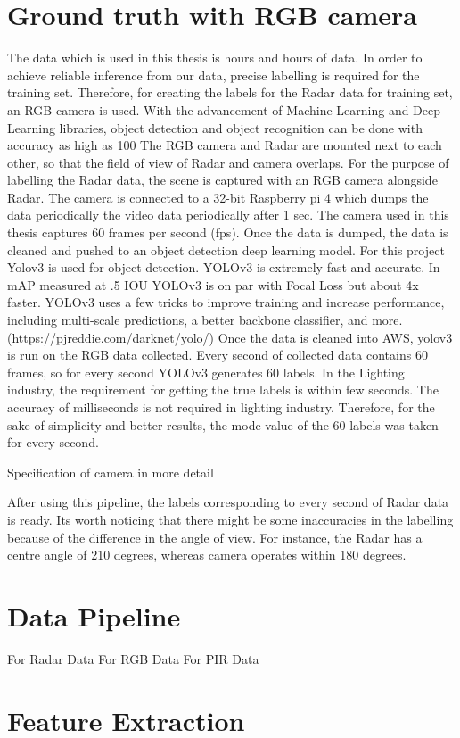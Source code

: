 \section{Ground truth with RGB camera}
\label{section:environments}
The data which is used in this thesis is hours and hours of data. In order to achieve reliable inference from our data, precise labelling is required for the training set. Therefore, for creating the labels for the Radar data for training set, an RGB camera is used. 
With the advancement of Machine Learning and Deep Learning libraries, object detection and object recognition can be done with accuracy as high as 100%
The RGB camera and Radar are mounted next to each other, so that the field of view of Radar and camera overlaps. For the purpose of labelling the Radar data, the scene is captured with an RGB camera alongside Radar. The camera is connected to a 32-bit Raspberry pi 4 which dumps the data periodically the video data periodically after 1 sec. The camera used in this thesis captures 60 frames per second (fps).
Once the data is dumped, the data is cleaned and pushed to an object detection deep learning model. For this project Yolov3 is used for object detection. YOLOv3 is extremely fast and accurate. In mAP measured at .5 IOU YOLOv3 is on par with Focal Loss but about 4x faster. YOLOv3 uses a few tricks to improve training and increase performance, including multi-scale predictions, a better backbone classifier, and more. 
(https://pjreddie.com/darknet/yolo/)
Once the data is cleaned into AWS, yolov3 is run on the RGB data collected. Every second of collected data contains 60 frames, so for every second YOLOv3 generates 60 labels. In the Lighting industry, the requirement for getting the true labels is within few seconds. The accuracy of milliseconds is not required in lighting industry. Therefore, for the sake of simplicity and better results, the mode value of the 60 labels was taken for every second. 

Specification of camera in more detail

After using this pipeline, the labels corresponding to every second of Radar data is ready.
Its worth noticing that there might be some inaccuracies in the labelling because of the difference in the angle of view. For instance, the Radar has a centre angle of 210 degrees, whereas camera operates within 180 degrees.


\section{Data Pipeline}
\label{section:environments}
For Radar Data
For RGB Data
For PIR Data


\section{Feature Extraction}
\label{section:environments}



